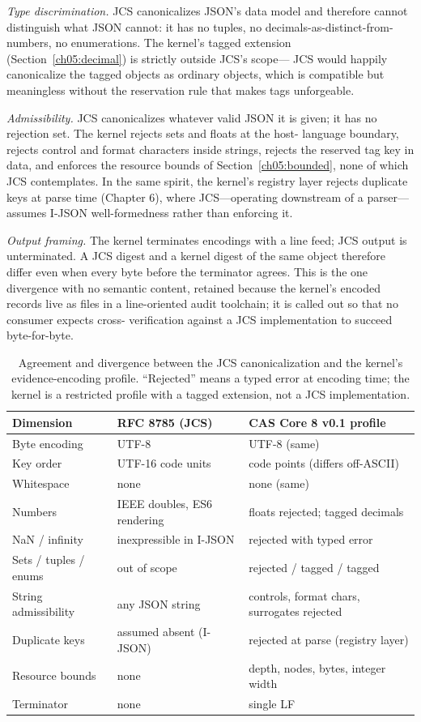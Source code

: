 \emph{Type discrimination.} JCS canonicalizes JSON's data model and
therefore cannot distinguish what JSON cannot: it has no tuples, no
decimals-as-distinct-from-numbers, no enumerations. The kernel's tagged
extension (Section~\ref{ch05:decimal}) is strictly outside JCS's scope---
JCS would happily canonicalize the tagged objects as ordinary objects,
which is compatible but meaningless without the reservation rule that
makes tags unforgeable.

\emph{Admissibility.} JCS canonicalizes whatever valid JSON it is given;
it has no rejection set. The kernel rejects sets and floats at the host-
language boundary, rejects control and format characters inside strings,
rejects the reserved tag key in data, and enforces the resource bounds of
Section~\ref{ch05:bounded}, none of which JCS contemplates. In the same
spirit, the kernel's registry layer rejects duplicate keys at parse time
(Chapter 6), where JCS---operating downstream of a parser---assumes
I-JSON well-formedness rather than enforcing it.

\emph{Output framing.} The kernel terminates encodings with a line feed;
JCS output is unterminated. A JCS digest and a kernel digest of the same
object therefore differ even when every byte before the terminator
agrees. This is the one divergence with no semantic content, retained
because the kernel's encoded records live as files in a line-oriented
audit toolchain; it is called out so that no consumer expects cross-
verification against a JCS implementation to succeed byte-for-byte.

\begin{table}[ht]
\centering
\begin{tabular}{lll}
\toprule
Dimension & RFC 8785 (JCS) & CAS Core 8 v0.1 profile \\
\midrule
Byte encoding & UTF-8 & UTF-8 (same) \\
Key order & UTF-16 code units & code points (differs off-ASCII) \\
Whitespace & none & none (same) \\
Numbers & IEEE doubles, ES6 rendering & floats rejected; tagged decimals \\
NaN / infinity & inexpressible in I-JSON & rejected with typed error \\
Sets / tuples / enums & out of scope & rejected / tagged / tagged \\
String admissibility & any JSON string & controls, format chars, surrogates rejected \\
Duplicate keys & assumed absent (I-JSON) & rejected at parse (registry layer) \\
Resource bounds & none & depth, nodes, bytes, integer width \\
Terminator & none & single LF \\
\bottomrule
\end{tabular}
\caption{Agreement and divergence between the JCS canonicalization and the
kernel's evidence-encoding profile. ``Rejected'' means a typed error at
encoding time; the kernel is a restricted profile with a tagged extension,
not a JCS implementation.}
\label{ch05:tab:jcs}
\end{table}

